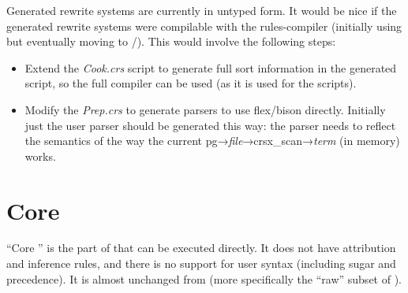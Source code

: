\documentclass[11pt]{article} %
\begin{document}
Generated  rewrite systems are currently in untyped  form. It would be nice if the
generated rewrite systems were compilable with the \CRSX rules-compiler (initially using  but
eventually moving to /\hax). This would involve the following steps:
\begin{itemize}

\item Extend the \emph{Cook.crs} script to generate full sort information in the generated 
  script, so the  full compiler can be used (as it is used for the \HAX scripts).

\item Modify the \emph{Prep.crs} to generate parsers to use flex/bison directly. Initially just the
  user parser should be generated this way: the parser needs to reflect the semantics of the way the
  current pg→\emph{file}→crsx\_scan→\emph{term} (in memory) works.

\end{itemize}


\appendix\small

\section{Core \HAX}
\label{app:core}

``Core '' is the part of  that can be executed directly. It does not have attribution and
inference rules, and there is no support for user syntax (including sugar and precedence). It is
almost unchanged from  (more specifically the ``raw'' subset of ).
\end{document}
